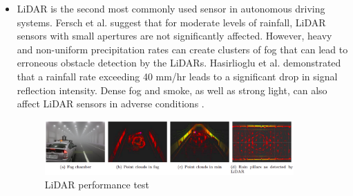 \documentclass[rnd]{mas_proposal}
\begin{document}
\begin{itemize}
      \item LiDAR is the second most commonly used sensor in autonomous driving systems. Fersch et al. \cite{fersch2016influence} suggest that for moderate levels of rainfall, LiDAR sensors with small apertures are not significantly affected. However, heavy and non-uniform precipitation rates can create clusters of fog that can lead to erroneous obstacle detection by the LiDARs. Hasirlioglu et al. \cite{hasirlioglu2016modeling} demonstrated that a rainfall rate exceeding 40 mm/hr leads to a significant drop in signal reflection intensity. Dense fog and smoke, as well as strong light, can also affect LiDAR sensors in adverse conditions \cite{Zhang2021Dec} \cite{acarballo2020libre}.
            \begin{figure}[h]
                  \centering
                  \includegraphics[width=0.9\textwidth]{images/lidar_issues.png}
                  \caption{LiDAR performance test \cite{Zhang2021Dec}}
                  \label{fig:lidar}
            \end{figure}


\end{itemize}
\end{document}
